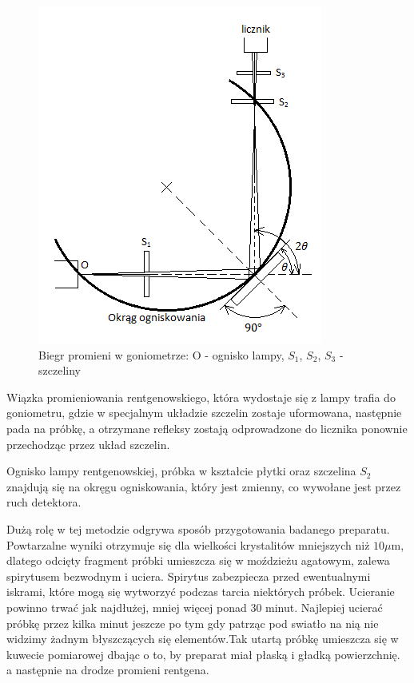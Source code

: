 \documentclass[a4paper,12pt]{article}
\numberwithin{equation}{section}
\begin{document}
\begin{figure}[h]
\centerline{\includegraphics[scale=1]{../img/biegPromieni}}
\caption{Biegr promieni w goniometrze: O - ognisko lampy, $S_1$,  $S_2$,  $S_3$ - szczeliny}
\label{biegPromieni}
\end{figure}


Wiązka promieniowania rentgenowskiego, która wydostaje się z lampy trafia do goniometru, gdzie w specjalnym układzie
szczelin zostaje uformowana, następnie pada na próbkę, a otrzymane refleksy zostają odprowadzone do licznika ponownie
przechodząc przez układ szczelin.

Ognisko lampy rentgenowskiej, próbka w kształcie płytki oraz szczelina $S_{2}$ znajdują się na okręgu ogniskowania, który jest 
zmienny, co wywołane jest przez ruch detektora.

Dużą rolę w tej metodzie odgrywa sposób przygotowania badanego preparatu. Powtarzalne wyniki otrzymuje się dla wielkości 
krystalitów mniejszych niż $10\mu$m, dlatego odcięty fragment próbki umieszcza się w moździeżu agatowym, zalewa spirytusem
bezwodnym i uciera. Spirytus zabezpiecza przed ewentualnymi iskrami, które mogą się wytworzyć podczas tarcia niektórych 
próbek. Ucieranie powinno trwać jak najdłużej, mniej więcej ponad 30 minut. Najlepiej ucierać próbkę przez kilka minut jeszcze po 
tym gdy patrząc pod swiatło na nią nie widzimy żadnym błyszczących się elementów.Tak utartą próbkę umieszcza się w kuwecie
pomiarowej dbając o to, by preparat miał płaską i gładką powierzchnię. a następnie na drodze promieni rentgena. 
\end{document}
